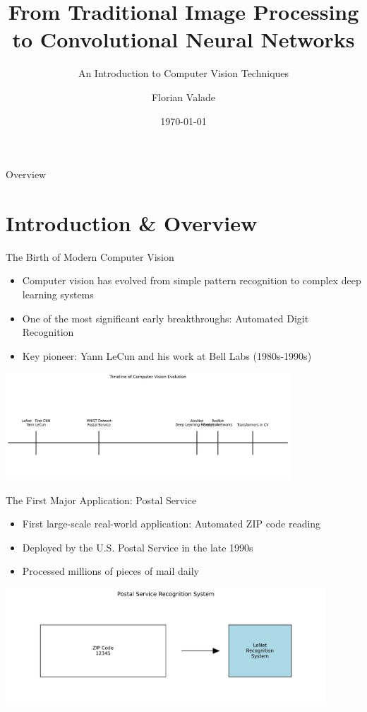 \documentclass{beamer}
\title{From Traditional Image Processing to Convolutional Neural Networks}
\subtitle{An Introduction to Computer Vision Techniques}
\author{Florian Valade}
\date{\today}
\begin{document}
\begin{frame}
  \titlepage
\end{frame}

\begin{frame}{Overview}
  \tableofcontents
\end{frame}

\section{Introduction \& Overview}

\begin{frame}{The Birth of Modern Computer Vision}
  \begin{itemize}
    \item Computer vision has evolved from simple pattern recognition to complex deep learning systems
    \item One of the most significant early breakthroughs: Automated Digit Recognition
    \item Key pioneer: Yann LeCun and his work at Bell Labs (1980s-1990s)
  \end{itemize}
  \begin{center}
    \includegraphics[width=0.8\textwidth]{images/timeline_cv.png}
  \end{center}
\end{frame}

\begin{frame}{The First Major Application: Postal Service}
  \begin{itemize}
    \item First large-scale real-world application: Automated ZIP code reading
    \item Deployed by the U.S. Postal Service in the late 1990s
    \item Processed millions of pieces of mail daily
  \end{itemize}
  \begin{center}
    \includegraphics[width=0.9\textwidth]{images/postal_recognition.png}
  \end{center}
\end{frame}
\end{document}
